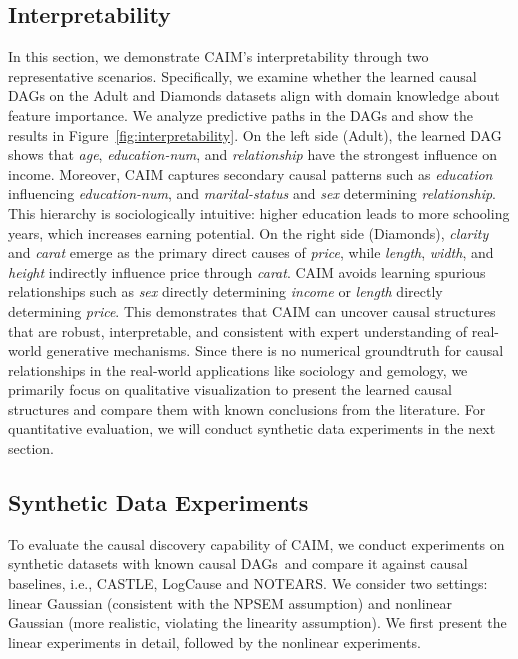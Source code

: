 \documentclass[sigconf, nonacm]{acmart}
\newcommand{\icde}[1]{{\color{black}#1}}
\newcommand{\sydesi}[1]{{\color{black}#1}}
\newcommand{\rlend}[1]{{\color{black}#1}}
\newcommand{\syadd}[1]{{\color{black}#1}}
\newcommand{\syexp}[1]{{\color{black}#1}}
\newcommand*{\ourmodel}{CAIM}
\begin{document}
\subsection{Interpretability}
In this section, we demonstrate \ourmodel{}’s interpretability through two representative scenarios. 
Specifically, we examine whether the learned causal DAGs on the Adult and Diamonds datasets align with domain knowledge about feature importance. We analyze predictive paths in the DAGs and show the results in Figure~\ref{fig:interpretability}.
\rlend{
On the left side (Adult), the learned DAG shows that \textit{age}, \textit{education-num}, and \textit{relationship} have the strongest influence on income. Moreover, \ourmodel{} captures secondary causal patterns such as \textit{education} influencing \textit{education-num}, and \textit{marital-status} and \textit{sex} determining \textit{relationship}. 
This hierarchy is sociologically intuitive: higher education leads to more schooling years, which increases earning potential\cite{r:hout2012}.
On the right side (Diamonds), \textit{clarity} and \textit{carat} emerge as the primary direct causes of \textit{price}, while \textit{length}, \textit{width}, and \textit{height} indirectly influence price through \textit{carat}\cite{r:diamonds}. 
\ourmodel{} avoids learning spurious relationships such as \textit{sex} directly determining \textit{income} or \textit{length} directly determining \textit{price}.}
This demonstrates that \ourmodel{} can uncover causal structures that are robust, interpretable, and consistent with expert understanding of real-world generative mechanisms.
\icde{
Since there is no numerical groundtruth for causal relationships in the real-world applications like sociology and gemology, we primarily focus on qualitative visualization to present the learned causal structures and compare them with known conclusions from the literature\cite{r:hout2012, r:diamonds}. 
For quantitative evaluation, we will conduct synthetic data experiments in the next section.
}


\subsection{Synthetic Data Experiments}
To evaluate the causal discovery capability of \ourmodel{}, we conduct experiments on synthetic datasets
with known causal DAGs~\sydesi{and compare it against causal baselines, i.e., CASTLE\cite{r:CASTLE}, LogCause\cite{r:linear}} \syexp{and NOTEARS\cite{notears}.
}
\syexp{We consider two settings: linear Gaussian (consistent with the NPSEM assumption) and nonlinear Gaussian (more realistic, violating the linearity assumption).}
We first present the linear experiments in detail, followed by the nonlinear experiments.
\end{document}

